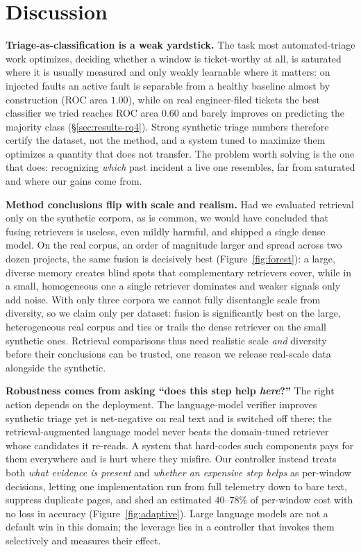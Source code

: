 \section{Discussion}
\label{sec:discussion}

\noindent\textbf{Triage-as-classification is a weak yardstick.} The task most
automated-triage work optimizes, deciding whether a window is ticket-worthy at
all, is saturated where it is usually measured and only weakly learnable where it
matters: on injected faults an active fault is separable from a healthy baseline
almost by construction (ROC area $1.00$), while on real engineer-filed tickets the
best classifier we tried reaches ROC area $0.60$ and barely improves on predicting
the majority class (\S\ref{sec:results-rq4}). Strong synthetic triage numbers
therefore certify the dataset, not the method, and a system tuned to maximize them
optimizes a quantity that does not transfer. The problem worth solving is the one
that does: recognizing \emph{which} past incident a live one resembles, far from
saturated and where our gains come from.

\noindent\textbf{Method conclusions flip with scale and realism.} Had we evaluated
retrieval only on the synthetic corpora, as is common, we would have concluded
that fusing retrievers is useless, even mildly harmful, and shipped a single dense
model. On the real corpus, an order of magnitude larger and spread across two
dozen projects, the same fusion is decisively best (Figure~\ref{fig:forest}): a large, diverse
memory creates blind spots that complementary retrievers cover, while in a small,
homogeneous one a single retriever dominates and weaker signals only add noise. With
only three corpora we cannot fully disentangle scale from diversity, so we claim only
per dataset: fusion is significantly best on the large, heterogeneous real corpus and
ties or trails the dense retriever on the small synthetic ones. Retrieval comparisons thus need realistic scale \emph{and}
diversity before their conclusions can be trusted, one reason we release
real-scale data alongside the synthetic.

\noindent\textbf{Robustness comes from asking ``does this step help \emph{here}?''}
The right action depends on the deployment. The language-model verifier improves
synthetic triage yet is net-negative on real text and is switched off there; the
retrieval-augmented language model never beats the domain-tuned retriever whose
candidates it re-reads. A system that hard-codes such components pays for them
everywhere and is hurt where they misfire. Our controller instead treats both
\emph{what evidence is present} and \emph{whether an expensive step helps} as
per-window decisions, letting one implementation run from full telemetry down to
bare text, suppress duplicate pages, and shed an estimated $40$--$78\%$ of per-window cost with no
loss in accuracy (Figure~\ref{fig:adaptive}). Large language models are not a default win in this
domain; the leverage lies in a controller that invokes them selectively and
measures their effect.

